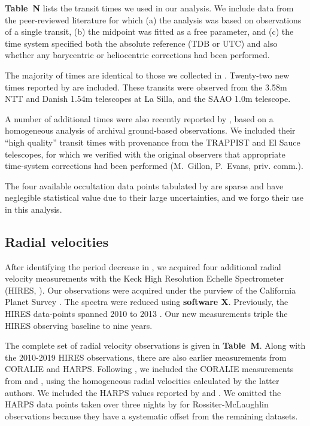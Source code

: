 \documentclass[12pt,twocolumn,tighten]{aastex62}
\begin{document}
{\bf Table~N} lists the transit times we used in our analysis.  We
include data from the peer-reviewed literature for which (a) the
analysis was based on observations of a single transit, (b) the
midpoint was fitted as a free parameter, and (c) the time system
specified both the absolute reference (TDB or UTC) and also whether
any barycentric or heliocentric corrections had been performed.

The majority of times are identical to those we collected in
.  Twenty-two new times reported by
\citet{southworth_transit_2019} are included.  These transits were
observed from the 3.58m NTT and Danish 1.54m telescopes at La Silla,
and the SAAO 1.0m telescope.

A number of additional times were also recently reported by
\citet{baluev_2019}, based on a homogeneous analysis of archival
ground-based observations.  We included their ``high quality'' transit
times with provenance from the TRAPPIST and El Sauce telescopes, for
which we verified with the original observers that appropriate
time-system corrections had been performed (M.~Gillon, P.~Evans,
priv{.} comm{.}).

The four available occultation data points tabulated by
 are sparse and have neglegible
statistical value due to their large uncertainties, and we forgo
their use in this analysis.  

\subsection{Radial velocities}

After identifying the period decrease in
, we acquired four additional radial
velocity measurements with the Keck High Resolution Echelle
Spectrometer (HIRES, \citealt{vogt_hires_1994}).  Our observations
were acquired under the purview of the California Planet Survey
\citep{howard_cps_2010}.  The spectra were reduced using {\bf software
X}.  Previously, the HIRES data-points spanned 2010 to 2013
\citep{knutson_friends_2014}.  Our new measurements triple the HIRES
observing baseline to nine years.

The complete set of radial velocity observations is given in {\bf
Table~M}.  Along with the 2010-2019 HIRES observations, there are also
earlier measurements from CORALIE and HARPS.  Following
, we included the CORALIE measurements
from \citet{wilson_wasp-4b_2008} and \citet{triaud_spin-orbit_2010},
using the homogeneous radial velocities calculated by the latter
authors. We included the HARPS values reported by
\citet{pont_determining_2011} and \citet{husnoo_observational_2012}.
We omitted the HARPS data points taken over three nights by
\citet{triaud_spin-orbit_2010} for Rossiter-McLaughlin observations
because they have a systematic offset from the remaining datasets.
\end{document}
